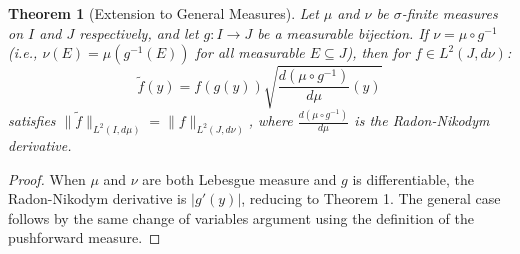 \documentclass{article}
\newtheorem{theorem}{Theorem}
\begin{document}
\begin{theorem}[Extension to General Measures]
Let $\mu$ and $\nu$ be $\sigma$-finite measures on $I$ and $J$ respectively, and let $g: I \to J$ be a measurable bijection. If $\nu = \mu \circ g^{-1}$ (i.e., $\nu(E) = \mu(g^{-1}(E))$ for all measurable $E \subseteq J$), then for $f \in L^2(J, d\nu)$:
$$\tilde{f}(y) = f(g(y)) \sqrt{\frac{d(\mu \circ g^{-1})}{d\mu}(y)}$$
satisfies $\|\tilde{f}\|_{L^2(I, d\mu)} = \|f\|_{L^2(J, d\nu)}$, where $\frac{d(\mu \circ g^{-1})}{d\mu}$ is the Radon-Nikodym derivative.
\end{theorem}

\begin{proof}
When $\mu$ and $\nu$ are both Lebesgue measure and $g$ is differentiable, the Radon-Nikodym derivative is $|g'(y)|$, reducing to Theorem 1. The general case follows by the same change of variables argument using the definition of the pushforward measure.
\end{proof}
\end{document}
